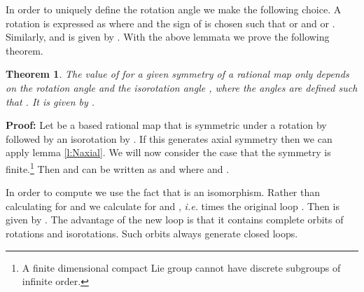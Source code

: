 \documentclass[a4paper,12pt]{article}
\newtheorem {theorem}{Theorem}[section]
\begin{document}
In order to uniquely define the rotation angle \myHighlight{$\alpha$}\coordHE{} we make the following 
choice. A rotation is expressed as 
%
\coordHE{}
%
where \myHighlight{$\alpha \in [- 2 \pi, 2 \pi]$}\coordHE{} and the sign of  
\coordHE{} is chosen such that \coordHE{} or \coordHE{} and \coordHE{} or \coordHE{}. Similarly, \myHighlight{$\beta \in [-2 \pi, 2 \pi]$}\coordHE{} and \coordHE{} is given by
\coordHE{}.
With the above lemmata we prove the following theorem.

\begin{theorem}
\label{t:N}
The value of \coordHE{} for a given symmetry of a rational map \coordHE{} only 
depends on the rotation angle \myHighlight{$\alpha$}\coordHE{} and the isorotation angle \myHighlight{$\beta$}\coordHE{}, where 
the angles are defined such that \coordHE{}. It 
is given by \coordHE{}.
\end{theorem}

{\bf Proof:}
Let \coordHE{} be a based rational map that is symmetric under a rotation by 
\myHighlight{$\alpha$}\coordHE{} followed by an isorotation by \myHighlight{$\beta$}\coordHE{}. If this generates axial 
symmetry then we can apply lemma \ref{l:Naxial}.
We will now consider the case that 
the symmetry is finite.\footnote{A finite dimensional compact Lie group 
cannot have discrete subgroups of infinite order.}
%
Then \myHighlight{$\alpha$}\coordHE{} and \myHighlight{$\beta$}\coordHE{} can be written as \coordHE{} and 
\coordHE{} where \coordHE{} and \coordHE{}.

In order to compute \coordHE{} we use the fact that \coordHE{} is an isomorphism. Rather 
than calculating \coordHE{} for \myHighlight{$\alpha$}\coordHE{} and \myHighlight{$\beta$}\coordHE{} we calculate \coordHE{} 
for \coordHE{} and \coordHE{}, {\it i.e.} 
\coordHE{} times the original loop \coordHE{}. Then  \coordHE{} is given by 
\coordHE{}.
The advantage of the new loop \coordHE{} is that it contains complete 
\coordHE{} orbits of rotations and isorotations. Such 
orbits always generate closed loops.
\end{document}
